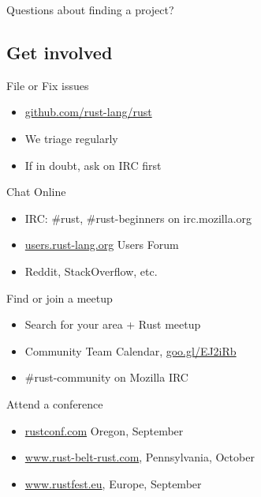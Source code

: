 \documentclass[100pt]{beamer}
\begin{document}
\begin{frame}
    Questions about finding a project?
\end{frame}

\subsection{Get involved}

\begin{frame}
    File or Fix issues
    \begin{itemize}
        \item \url{github.com/rust-lang/rust}
        \item We triage regularly
        \item If in doubt, ask on IRC first
    \end{itemize}
\end{frame}

\begin{frame}
    Chat Online
    \begin{itemize}
        \item IRC: \#rust, \#rust-beginners on irc.mozilla.org
        \item \url{users.rust-lang.org} Users Forum
        \item Reddit, StackOverflow, etc.
    \end{itemize}
\end{frame}

\begin{frame}
    Find or join a meetup
    \begin{itemize}
        \item Search for your area + Rust meetup
        \item Community Team Calendar, \url{goo.gl/EJ2iRb}
        \item \#rust-community on Mozilla IRC
    \end{itemize}
\end{frame}

\begin{frame}
    Attend a conference
    \begin{itemize}
        \item \url{rustconf.com} Oregon, September
        \item \url{www.rust-belt-rust.com}, Pennsylvania, October
        \item \url{www.rustfest.eu}, Europe, September
    \end{itemize}
\end{frame}
\end{document}
